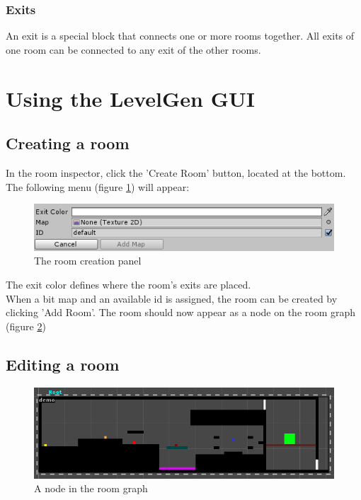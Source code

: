\documentclass[a4paper]{article}
\begin{document}
	\subsubsection{Exits}
	An exit is a special block that connects one or more rooms together. All exits of one room can be connected to any exit of the other rooms.
	
	\newpage
	
	\section{Using the LevelGen GUI}
	\subsection{Creating a room}
	In the room inspector, click the 'Create Room' button, located at the bottom. The following menu (figure \ref{fig:create_room}) will appear:
	
	\begin{figure}[h]
		\includegraphics[width=\linewidth]{img/Menu_CreateRoom.PNG}
		\caption{The room creation panel}
		\label{fig:create_room}
	\end{figure}

	The exit color defines where the room's exits are placed. 
	\\When a bit map and an available id is assigned, the room can be created by clicking 'Add Room'. The room should now appear as a node on the room graph (figure \ref{fig:node_room})
	
	\subsection{Editing a room}
	\begin{figure}[h]
		\includegraphics[width=\linewidth]{img/Node_Room.PNG}
		\caption{A node in the room graph}
		\label{fig:node_room}
	\end{figure}
	
\end{document}
